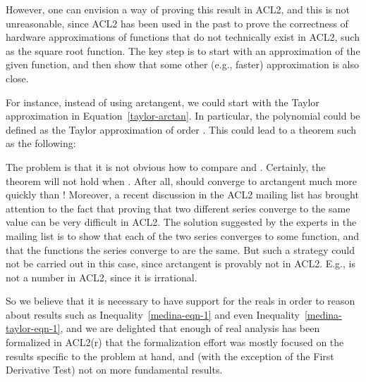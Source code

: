 \documentclass[copyright,creativecommons]{eptcs}
\begin{document}
However, one can envision a way of proving this result in ACL2, and
this is not unreasonable, since ACL2 has been used in the past to
prove the correctness of hardware approximations of functions that do
not technically exist in ACL2, such as the square root function. The
key step is to start with an approximation of the given function, and
then show that some other (e.g., faster) approximation is also close.

For instance, instead of using arctangent, we could start with the
Taylor approximation in Equation~\ref{taylor-arctan}. In particular,
the polynomial  could be defined as the Taylor approximation
of order . This could lead to a theorem such as the following:

The problem is that it is not obvious how to compare  and
. Certainly, the theorem will not hold when .  After all,
 should converge to arctangent much more quickly than !
Moreover, a recent discussion in the ACL2 mailing list has brought
attention to the fact that proving that two different series converge
to the same value can be very difficult in ACL2. The solution
suggested by the experts in the mailing list is to show that each of
the two series converges to some function, and that the functions the
series converge to are the same. But such a strategy could not be
carried out in this case, since arctangent is provably not in ACL2.
E.g.,  is not a number in ACL2, since it is
irrational.

So we believe that it is necessary to have support for the reals in
order to reason about results such as Inequality~\ref{medina-eqn-1} and
even Inequality~\ref{medina-taylor-eqn-1}, and we are delighted that
enough of real analysis has been formalized in ACL2(r) that the
formalization effort was mostly focused on the results specific to the
problem at hand, and (with the exception of the First Derivative Test)
not on more fundamental results.



\end{document}
